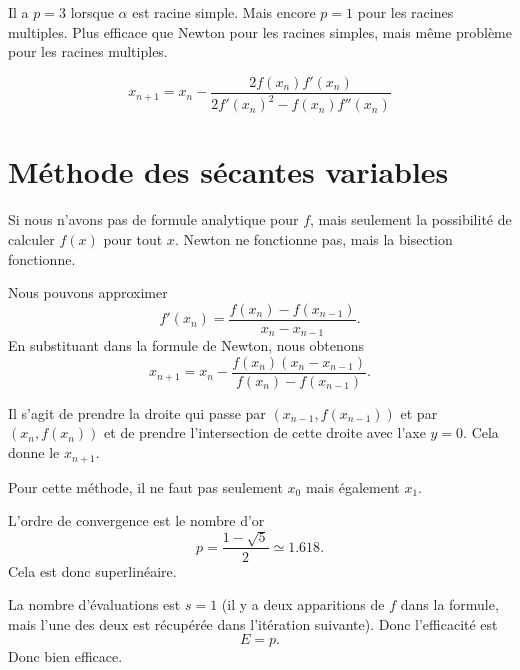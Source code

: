Il a \( p=3\) lorsque \( \alpha\) est racine simple. Mais encore \( p=1\) pour les racines multiples. Plus efficace que Newton pour les racines simples, mais même problème pour les racines multiples.

\begin{equation}
    x_{n+1}=x_n-\frac{ 2f(x_n)f'(x_n) }{ 2f'(x_n)^2-f(x_n)f''(x_n) }
\end{equation}

\section{Méthode des sécantes variables}
\label{SECooIUEUooVcHAoc}

Si nous n'avons pas de formule analytique pour \( f\), mais seulement la possibilité de calculer \( f(x)\) pour tout \( x\). Newton ne fonctionne pas, mais la bisection fonctionne.

Nous pouvons approximer
\begin{equation}
    f'(x_n)=\frac{ f(x_n)-f(x_{n-1}) }{ x_n-x_{n-1} }.
\end{equation}
En substituant dans la formule de Newton, nous obtenons
\begin{equation}
    x_{n+1}=x_n-\frac{ f(x_n)(x_n-x_{n-1}) }{ f(x_n)-f(x_{n-1}) }.
\end{equation}

Il s'agit de prendre la droite qui passe par \( (x_{n-1},f(x_{n-1}))\) et par \( (x_n,f(x_n))\) et de prendre l'intersection de cette droite avec l'axe \( y=0\). Cela donne le \( x_{n+1}\).

Pour cette méthode, il ne faut pas seulement \( x_0\) mais également \( x_1\).

L'ordre de convergence est le nombre d'or
\begin{equation}    \label{EQooQEFCooUsGVjP}
    p=\frac{ 1-\sqrt{ 5 } }{ 2 }\simeq 1.618.
\end{equation}
Cela est donc superlinéaire.

La nombre d'évaluations est \( s=1\) (il y a deux apparitions de \( f\) dans la formule, mais l'une des deux est récupérée dans l'itération suivante). Donc l'efficacité est
\begin{equation}
    E=p.
\end{equation}
Donc bien efficace.

